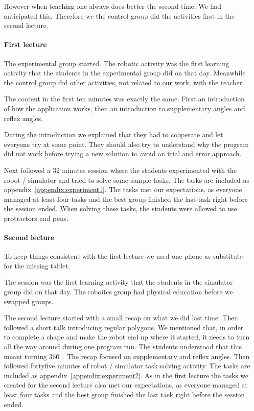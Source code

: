 However when teaching one always does better the second time. We had anticipated this. Therefore we the control group did the activities first in the second lecture.

\paragraph{First lecture}
The experimental group started. The robotic activity was the first learning activity that the students in the experimental group did on that day. 
Meanwhile the control group did other activities, not related to our work, with the teacher.

\bigskip\noindent
The content in the first ten minutes was exactly the same. First an introduction of how the application works, then an introduction to supplementary angles and reflex angles. 

\bigskip\noindent
During the introduction we explained that they had to cooperate and let everyone try at some point. They should also try to understand why the program did not work before trying a new solution to avoid an trial and error approach.

\bigskip\noindent
Next followed a 32 minutes session where the students experimented with the robot / simulator and tried to solve some sample tasks. The tasks are included as appendix~\ref{appendix:experiment1}.
The tasks met our expectations, as everyone managed at least four tasks and the best group finished the last task right before the session ended. When solving these tasks, the students were allowed to use protractors and pens. 

\paragraph{Second lecture}
To keep things consistent with the first lecture we used one phone as substitute for the missing tablet.

\bigskip\noindent
The session was the first learning activity that the students in the simulator group did on that day. 
The roboitcs group had physical education before we swapped groups.

\bigskip\noindent
The second lecture started with a small recap on what we did last time. Then followed a short talk introducing regular polygons. We mentioned that, in order to complete a shape and make the robot end up where it started, it needs to turn all the way around during one program run. The students understood that this meant turning $360\,^{\circ}$. The recap focused on supplementary and reflex angles. Then followed fortyfive minutes of robot / simulator task solving activity. The tasks are included as appendix~\ref{appendix:experiment2}.
As in the first lecture the tasks we created for the second lecture also met our expectations, as everyone managed at least four tasks and the best group finished the last task right before the session ended. 